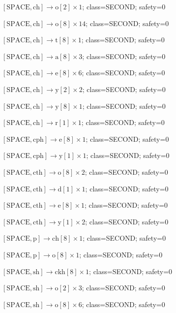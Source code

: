 \(\left[\mathrm{SPACE}, \mathrm{ch}\right] \to \mathrm{o}[2] \times 1\); class=SECOND; safety=0\par
\(\left[\mathrm{SPACE}, \mathrm{ch}\right] \to \mathrm{o}[8] \times 14\); class=SECOND; safety=0\par
\(\left[\mathrm{SPACE}, \mathrm{ch}\right] \to \mathrm{t}[8] \times 1\); class=SECOND; safety=0\par
\(\left[\mathrm{SPACE}, \mathrm{ch}\right] \to \mathrm{a}[8] \times 3\); class=SECOND; safety=0\par
\(\left[\mathrm{SPACE}, \mathrm{ch}\right] \to \mathrm{e}[8] \times 6\); class=SECOND; safety=0\par
\(\left[\mathrm{SPACE}, \mathrm{ch}\right] \to \mathrm{y}[2] \times 2\); class=SECOND; safety=0\par
\(\left[\mathrm{SPACE}, \mathrm{ch}\right] \to \mathrm{y}[8] \times 1\); class=SECOND; safety=0\par
\(\left[\mathrm{SPACE}, \mathrm{ch}\right] \to \mathrm{r}[1] \times 1\); class=SECOND; safety=0\par
\(\left[\mathrm{SPACE}, \mathrm{cph}\right] \to \mathrm{e}[8] \times 1\); class=SECOND; safety=0\par
\(\left[\mathrm{SPACE}, \mathrm{cph}\right] \to \mathrm{y}[1] \times 1\); class=SECOND; safety=0\par
\(\left[\mathrm{SPACE}, \mathrm{cth}\right] \to \mathrm{o}[8] \times 2\); class=SECOND; safety=0\par
\(\left[\mathrm{SPACE}, \mathrm{cth}\right] \to \mathrm{d}[1] \times 1\); class=SECOND; safety=0\par
\(\left[\mathrm{SPACE}, \mathrm{cth}\right] \to \mathrm{e}[8] \times 1\); class=SECOND; safety=0\par
\(\left[\mathrm{SPACE}, \mathrm{cth}\right] \to \mathrm{y}[1] \times 2\); class=SECOND; safety=0\par
\(\left[\mathrm{SPACE}, \mathrm{p}\right] \to \mathrm{ch}[8] \times 1\); class=SECOND; safety=0\par
\(\left[\mathrm{SPACE}, \mathrm{p}\right] \to \mathrm{o}[8] \times 1\); class=SECOND; safety=0\par
\(\left[\mathrm{SPACE}, \mathrm{sh}\right] \to \mathrm{ckh}[8] \times 1\); class=SECOND; safety=0\par
\(\left[\mathrm{SPACE}, \mathrm{sh}\right] \to \mathrm{o}[2] \times 3\); class=SECOND; safety=0\par
\(\left[\mathrm{SPACE}, \mathrm{sh}\right] \to \mathrm{o}[8] \times 6\); class=SECOND; safety=0\par
